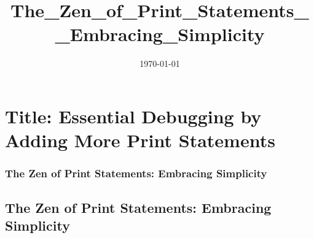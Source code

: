 \documentclass{article}
\title{The_Zen_of_Print_Statements__Embracing_Simplicity}
\date{\today}
\begin{document}
\maketitle
\tableofcontents
\newpage





\part*{Title: Essential Debugging by Adding More Print Statements} %
\label{part-1-Title__Essential_Debugging_by_Adding_Mor}


\section*{The Zen of Print Statements: Embracing Simplicity} %
\label{chapter-1-1-The_Zen_of_Print_Statements__Embracing_S}

\chapter{The Zen of Print Statements: Embracing Simplicity}
\end{document}
